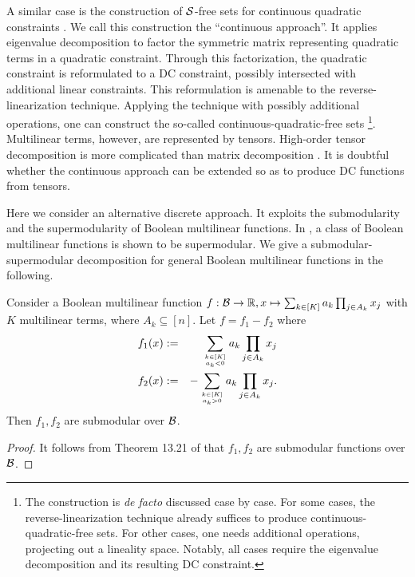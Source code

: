  A similar case is the construction of $\mathcal S$-free sets  for continuous quadratic constraints \cite{munoz2020maximal}. We call this construction the ``continuous approach''. It applies eigenvalue decomposition to factor the symmetric matrix representing quadratic terms in a quadratic constraint. Through this factorization, the quadratic constraint is reformulated to a DC constraint, possibly intersected with additional linear constraints. This reformulation is amenable to the reverse-linearization technique. Applying the technique with possibly additional operations, one can construct the so-called continuous-quadratic-free sets  \cite{munoz2020maximal} \footnote{The construction is \textit{de facto} discussed case by case. For some cases,  the reverse-linearization technique already suffices to produce continuous-quadratic-free sets. For other cases, one needs additional operations, \eg projecting out a lineality space. Notably, all cases require the eigenvalue decomposition and its resulting DC constraint.}. Multilinear terms, however, are represented by tensors. High-order tensor decomposition is  more complicated than matrix decomposition \cite{kolda2009tensor}. It is doubtful whether the continuous approach can be extended so as to produce DC functions from tensors.
 
Here we consider an alternative discrete approach. It exploits the submodularity and the supermodularity of Boolean multilinear functions. In \cite{billionnet1985maximizing,nemhauser1978analysis}, a class of Boolean multilinear functions is shown to be supermodular. We give a submodular-supermodular decomposition for general Boolean multilinear functions in the following.

\begin{proposition}
\label{lem.supml}
Consider a Boolean multilinear function $f: \mathcal B \to \mathbb R, x \mapsto \sum_{k \in [K]} a_k \prod_{j \in A_k}x_j$  with $K$ multilinear terms, where  $A_k \subseteq [n]$. Let $f = f_1 - f_2$ where
\begin{eqnarray}
    f_1(x) &:=& \quad \sum\limits_{k \in [K]\atop a_k < 0} a_k \prod\limits_{j \in A_k}x_j \label{prop9a}\\
    f_2(x) &:=& -\sum\limits_{k \in [K]\atop a_k > 0} a_k \prod\limits_{j \in A_k}x_j.\label{prop9b}
\end{eqnarray}
Then  $f_1,f_2$ are submodular over $\mathcal B$.
\end{proposition}
\begin{proof}
It follows from Theorem 13.21 of \cite{crama2011boolean} that $f_1,f_2$ are submodular functions over $\mathcal B$.\end{proof}


